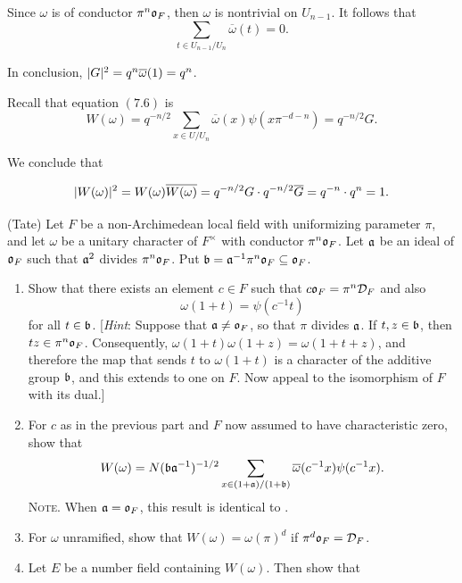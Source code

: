 \begin{solution}
  Since $\omega$ is of conductor $\pi^n \mathfrak{o}_F$, then $\omega$ is nontrivial on $U_{n-1}$.
  It follows that
  \[\sum_{t \in U_{n-1}/ U_n} \overline{\omega}(t) = 0. \]

  In conclusion, $\lvert G\rvert^2 = q ^ n \overline{\omega}(1) = q ^ n$.

  Recall that equation $(7.6)$ is
  \[W(\omega) = q ^ {-n/2} \sum_{x \in U/ U_n} \overline{\omega}(x) \psi(x \pi^{-d-n}) = q ^ {-n/2} G.\]

  We conclude that

  \[\lvert W(\omega)\rvert^2 = W(\omega) \overline{W(\omega)} = q ^ {-n/2} G \cdot q ^{-n/2} \overline{G} =
  q ^{-n} \cdot q ^ n = 1. \]


\end{solution}

\begin{exercise}[10]
  \label{ex:ch7-10}
  (Tate) Let $F$ be a non-Archimedean local field with uniformizing parameter
  $\pi$, and let $\omega$ be a unitary character of $F^\times$ with conductor
  $\pi^n\mathfrak{o}_F$. Let $\mathfrak{a}$ be an ideal of $\mathfrak{o}_F$ such that
  $\mathfrak{a}^2$ divides $\pi^n\mathfrak{o}_F$. Put
  $\mathfrak{b} = \mathfrak{a}^{-1}\pi^n\mathfrak{o}_F \subseteq \mathfrak{o}_F$.
  \begin{enumerate}[label=(\alph*)]
    \item Show that there exists an element $c \in F$ such that
      $c\mathfrak{o}_F = \pi^n\mathcal{D}_F$ and also
      \[
        \omega(1+t) = \psi(c^{-1}t)
      \]
      for all $t \in \mathfrak{b}$. [\emph{Hint}: Suppose that
      $\mathfrak{a} \neq \mathfrak{o}_F$, so that $\pi$ divides $\mathfrak{a}$. If
      $t, z \in \mathfrak{b}$, then $tz \in \pi^n\mathfrak{o}_F$. Consequently,
      $\omega(1+t)\omega(1+z) = \omega(1+t+z)$, and therefore the map that
      sends $t$ to $\omega(1+t)$ is a character of the additive group
      $\mathfrak{b}$, and this extends to one on $F$. Now appeal to the isomorphism
      of $F$ with its dual.]
    \item For $c$ as in the previous part and $F$ now assumed to have
      characteristic zero, show that
      \[
        W(\omega) = N(\mathfrak{b}\mathfrak{a}^{-1})^{-1/2}
        \sum_{x \in (1+\mathfrak{a})/(1+\mathfrak{b})}
        \overline{\omega}(c^{-1}x)\psi(c^{-1}x).
      \]
      \textsc{Note}. When $\mathfrak{a} = \mathfrak{o}_F$, this result is identical to
      .
    \item For $\omega$ unramified, show that $W(\omega) = \omega(\pi)^d$ if
      $\pi^d\mathfrak{o}_F = \mathcal{D}_F$.
    \item Let $E$ be a number field containing $W(\omega)$. Then show that

\end{enumerate}
\end{exercise}
